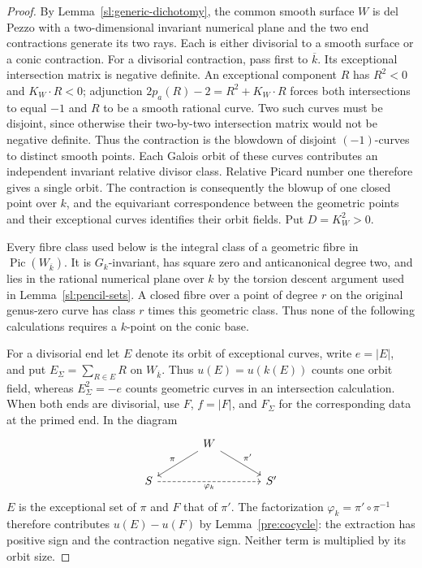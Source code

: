 \begin{proof}
By Lemma~\ref{sl:generic-dichotomy}, the common smooth surface $W$ is
del Pezzo with a two-dimensional invariant numerical plane and the
two end contractions generate its two rays.  Each is either divisorial
to a smooth surface or a conic contraction.  For a divisorial
contraction, pass first to $\overline k$.  Its exceptional intersection
matrix is negative definite.  An exceptional component $R$ has
$R^2<0$ and $K_W\cdot R<0$; adjunction
$2p_a(R)-2=R^2+K_W\cdot R$ forces both intersections to equal $-1$
and $R$ to be a smooth rational curve.  Two such curves must be
disjoint, since otherwise their two-by-two intersection matrix would
not be negative definite.  Thus the contraction is the blowdown of
disjoint $(-1)$-curves to distinct smooth points.  Each Galois orbit
of these curves contributes an independent invariant relative divisor
class.  Relative Picard number one therefore gives a single orbit.
The contraction is consequently the blowup of one closed point over
$k$, and the equivariant correspondence between the geometric points
and their exceptional curves identifies their orbit fields.
Put $D=K_W^2>0$.

Every fibre class used below is the integral class of a geometric
fibre in $\operatorname{Pic}(W_{\overline k})$.  It is $G_k$-invariant,
has square zero and anticanonical degree two, and lies in the rational
numerical plane over $k$ by the torsion descent argument used in
Lemma~\ref{sl:pencil-sets}.  A closed fibre over a point of degree $r$
on the original genus-zero curve has class $r$ times this geometric
class.  Thus none of the following calculations requires a $k$-point
on the conic base.

For a divisorial end let $E$ denote its orbit of exceptional curves,
write $e=|E|$, and put $E_\Sigma=\sum_{R\in E}R$ on
$W_{\overline k}$.  Thus $u(E)=u(k(E))$ counts one orbit field,
whereas $E_\Sigma^2=-e$ counts geometric curves in an intersection
calculation.  When both ends are divisorial, use $F$, $f=|F|$, and
$F_\Sigma$ for the corresponding data at the primed end.  In the diagram
\[
\begin{tikzcd}[column sep=large]
 &W\arrow[dl,"\pi"']\arrow[dr,"\pi'"]&\\
 S\arrow[rr,dashed,"\varphi_k"']&&S'
\end{tikzcd}
\]
$E$ is the exceptional set of $\pi$ and $F$ that of $\pi'$.
The factorization $\varphi_k=\pi'\circ\pi^{-1}$ therefore contributes
$u(E)-u(F)$ by Lemma~\ref{pre:cocycle}: the extraction has positive
sign and the contraction negative sign.  Neither term is multiplied
by its orbit size.


\end{proof}
